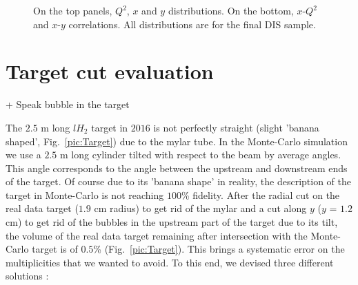 \begin{figure}[!h]
	\caption{On the top panels, $Q^2$, $x$ and $y$ distributions. On the bottom, $x$-$Q^2$ and $x$-$y$ correlations. All distributions are for the final DIS sample.}
	\label{pic:DISdist}
\end{figure}


\section{Target cut evaluation} \label{sec:targetcut}

+ Speak bubble in the target

The $2.5$ m long $lH_2$ target in $2016$ is not perfectly straight (slight 'banana shaped', Fig.~\ref{pic:Target}) due to the mylar tube. In the Monte-Carlo simulation we use a $2.5$ m long cylinder tilted with respect to the beam by average angles. This angle corresponds to the angle between the upstream and downstream ends of the target. Of course due to its 'banana shape' in reality, the description of the target in Monte-Carlo is not reaching $100$\% fidelity. After the radial cut on the real data target ($1.9$ cm radius) to get rid of the mylar and a cut along $y$ ($y$ = $1.2$ cm) to get rid of the bubbles in the upstream part of the target due to its tilt, the volume of the real data target remaining after intersection with the Monte-Carlo target is of $0.5$\% (Fig.~\ref{pic:Target}). This brings a systematic error on the multiplicities that we wanted to avoid. To this end, we devised three different solutions :

